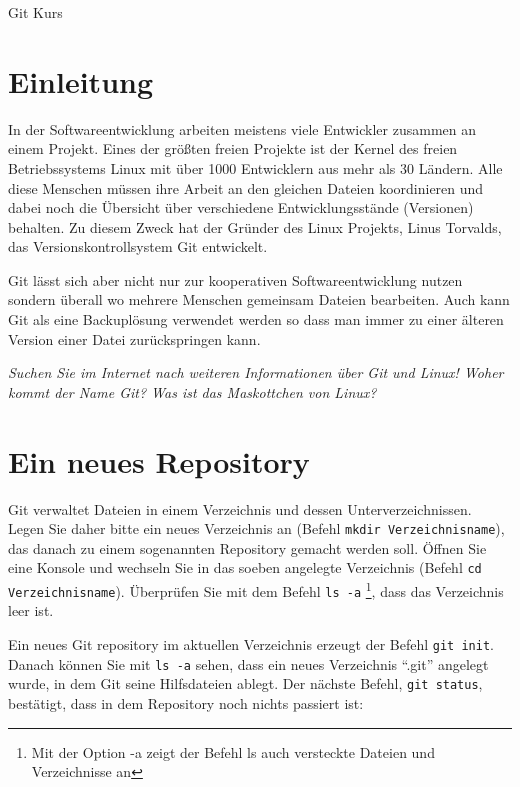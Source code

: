\documentclass[11pt,a4paper,twoside]{scrartcl}
\begin{document}
\begin{center}
  {\LARGE Git Kurs \par}
\end{center}

\section{Einleitung}

In der Softwareentwicklung arbeiten meistens viele Entwickler zusammen an
einem Projekt. Eines der größten freien Projekte ist der Kernel des freien
Betriebssystems Linux mit über 1000 Entwicklern aus mehr als 30 Ländern. Alle
diese Menschen müssen ihre Arbeit an den gleichen Dateien koordinieren und
dabei noch die Übersicht über verschiedene Entwicklungsstände (Versionen)
behalten. Zu diesem Zweck hat der Gründer des Linux Projekts, Linus Torvalds,
das Versionskontrollsystem Git entwickelt.

Git lässt sich aber nicht nur zur kooperativen Softwareentwicklung nutzen
sondern überall wo mehrere Menschen gemeinsam Dateien bearbeiten. Auch kann
Git als eine Backuplösung verwendet werden so dass man immer zu einer älteren
Version einer Datei zurückspringen kann.

\emph{Suchen Sie im Internet nach weiteren Informationen über Git und Linux! Woher
  kommt der Name Git? Was ist das Maskottchen von Linux?}

\section{Ein neues Repository}

Git verwaltet Dateien in einem Verzeichnis und dessen
Unterverzeichnissen. Legen Sie daher bitte ein neues Verzeichnis an (Befehl
\lstinline{mkdir Verzeichnisname}), das danach zu einem sogenannten Repository gemacht
werden soll. Öffnen Sie eine Konsole und wechseln Sie in das soeben angelegte
Verzeichnis (Befehl \lstinline{cd Verzeichnisname}). Überprüfen Sie mit dem Befehl \lstinline{ls -a}
\footnote{Mit der Option -a zeigt der Befehl ls auch versteckte Dateien und
  Verzeichnisse an}, dass das Verzeichnis leer ist.

Ein neues Git repository im aktuellen Verzeichnis erzeugt der Befehl
\lstinline{git init}. Danach können Sie mit \lstinline{ls -a} sehen, dass ein
neues Verzeichnis ``.git'' angelegt wurde, in dem Git seine Hilfsdateien
ablegt. Der nächste Befehl, \lstinline{git status}, bestätigt, dass in dem
Repository noch nichts passiert ist:
\end{document}
